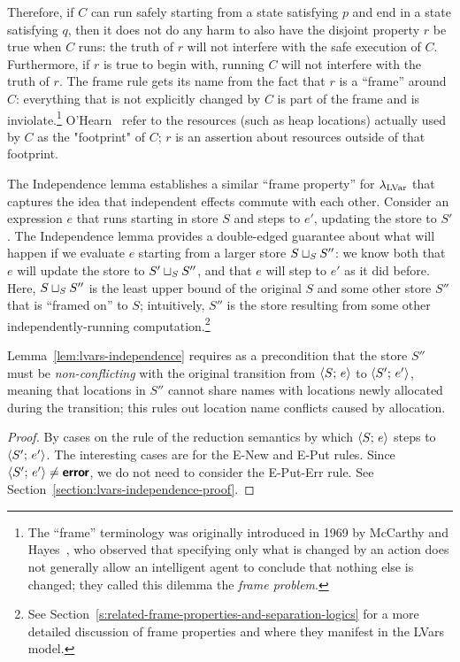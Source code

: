 Therefore, if $C$ can run safely starting from a state satisfying $p$
and end in a state satisfying $q$, then it does not do any harm to
also have the disjoint property $r$ be true when $C$ runs: the truth
of $r$ will not interfere with the safe execution of $C$.
Furthermore, if $r$ is true to begin with, running $C$ will not
interfere with the truth of $r$.  The frame rule gets its name from
the fact that $r$ is a ``frame'' around $C$: everything that is not
explicitly changed by $C$ is part of the frame and is
inviolate.\footnote{The ``frame'' terminology was originally
  introduced in 1969 by McCarthy and Hayes~\cite{McCarthyHayesFrame},
  who observed that specifying only what is changed by an action does
  not generally allow an intelligent agent to conclude that nothing
  else is changed; they called this dilemma the \emph{frame problem}.}
O'Hearn \etal~refer to the resources (such as heap locations) actually
used by $C$ as the "footprint" of $C$; $r$ is an assertion about
resources outside of that footprint.

The Independence lemma establishes a similar ``frame property'' for
$\lambda_{\textrm{LVar}}$ that captures the idea that independent effects commute
with each other.  Consider an expression $e$ that runs starting in
store $S$ and steps to $e'$, updating the store to $S'$.  The
Independence lemma provides a double-edged guarantee about what will
happen if we evaluate $e$ starting from a larger store
$S \sqcup_{S} S''$: we know both that $e$ will update the store to
$S' \sqcup_{S} S''$, and that $e$ will step to $e'$ as it did before.
Here, $S \sqcup_{S} S''$ is the least upper bound of the original $S$
and some other store $S''$ that is ``framed on'' to $S$; intuitively,
$S''$ is the store resulting from some other independently-running
computation.\footnote{See
  Section~\ref{s:related-frame-properties-and-separation-logics} for a
  more detailed discussion of frame properties and where they manifest
  in the LVars model.}

Lemma~\ref{lem:lvars-independence} requires as a precondition that the
store $S''$ must be \emph{non-conflicting} with the original
transition from $\langle S;\, e \rangle$ to $\langle S';\, e' \rangle$, meaning that
locations in $S''$ cannot share names with locations newly allocated
during the transition; this rules out location name conflicts caused
by allocation.

\LVarsDefNonConflicting

\LVarsLemIndependence
\begin{proof}
  By cases on the rule of the reduction semantics by which
  $\langle S;\, e \rangle$ steps to $\langle S';\, e' \rangle$. The interesting cases
  are for the {\sc E-New} and {\sc E-Put} rules.  Since
  $\langle S';\, e' \rangle \neq \textbf{\textsf{error}}$, we do not need to consider the {\sc
    E-Put-Err} rule.  See
  Section~\ref{section:lvars-independence-proof}.
\end{proof}

